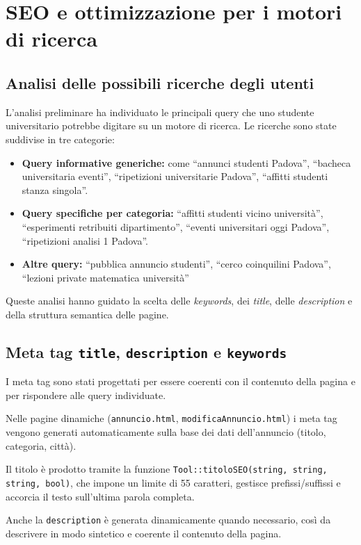 \documentclass[a4paper,12pt]{article}
\begin{document}
\section{SEO e ottimizzazione per i motori di ricerca}
\subsection{Analisi delle possibili ricerche degli utenti}

L’analisi preliminare ha individuato le principali query che uno studente universitario potrebbe digitare su un motore di ricerca. Le ricerche sono state suddivise in tre categorie:

\begin{itemize}
    \item\textbf{Query informative generiche:} come ``annunci studenti Padova'',  ``bacheca universitaria eventi'', ``ripetizioni universitarie Padova'', ``affitti studenti stanza singola''.
    \item\textbf{Query specifiche per categoria:} ``affitti studenti vicino università'', ``esperimenti retribuiti dipartimento'', ``eventi universitari oggi Padova'', ``ripetizioni analisi 1 Padova''.
    \item\textbf{Altre query:}  ``pubblica annuncio studenti'', ``cerco coinquilini Padova'', ``lezioni private matematica università''
\end{itemize}

Queste analisi hanno guidato la scelta delle \textit{keywords}, dei \textit{title}, delle \textit{description} e della struttura semantica delle pagine.

\subsection{Meta tag \texttt{title}, \texttt{description} e \texttt{keywords}}
I meta tag sono stati progettati per essere coerenti con il contenuto della pagina e per rispondere alle query individuate.

Nelle pagine dinamiche (\texttt{annuncio.html}, \texttt{modificaAnnuncio.html}) i meta tag vengono generati automaticamente sulla base dei dati dell’annuncio (titolo, categoria, città).  

Il titolo è prodotto tramite la funzione \texttt{Tool::titoloSEO(string, string, string, bool)}, che impone un limite di 55 caratteri, gestisce prefissi/suffissi e accorcia il testo sull’ultima parola completa.

Anche la \texttt{description} è generata dinamicamente quando necessario, così da descrivere in modo sintetico e coerente il contenuto della pagina.
\end{document}
